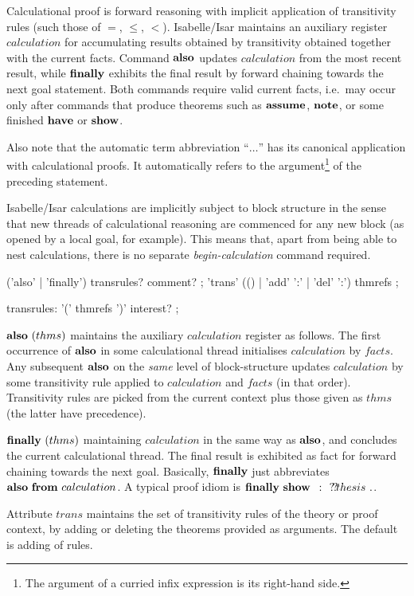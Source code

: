 Calculational proof is forward reasoning with implicit application of
transitivity rules (such those of $=$, $\le$, $<$).  Isabelle/Isar maintains
an auxiliary register $calculation$ for accumulating
results obtained by transitivity obtained together with the current facts.
Command ${\mathord{\mathbf{also}}}$ updates $calculation$ from the most recent result, while
${\mathord{\mathbf{finally}}}$ exhibits the final result by forward chaining towards the next goal
statement.  Both commands require valid current facts, i.e.\ may occur only
after commands that produce theorems such as ${\mathord{\mathbf{assume}}}$, ${\mathord{\mathbf{note}}}$, or
some finished ${\mathord{\mathbf{have}}}$ or ${\mathord{\mathbf{show}}}$.

Also note that the automatic term abbreviation ``$\dots$'' has its canonical
application with calculational proofs.  It automatically refers to the
argument\footnote{The argument of a curried infix expression is its right-hand
  side.} of the preceding statement.

Isabelle/Isar calculations are implicitly subject to block structure in the
sense that new threads of calculational reasoning are commenced for any new
block (as opened by a local goal, for example).  This means that, apart from
being able to nest calculations, there is no separate \emph{begin-calculation}
command required.

\begin{rail}
  ('also' | 'finally') transrules? comment?
  ;
  'trans' (() | 'add' ':' | 'del' ':') thmrefs
  ;

  transrules: '(' thmrefs ')' interest?
  ;
\end{rail}

\begin{descr}
\item [${\mathord{\mathbf{also}}}~(thms)$] maintains the auxiliary $calculation$ register as
  follows.  The first occurrence of ${\mathord{\mathbf{also}}}$ in some calculational thread
  initialises $calculation$ by $facts$. Any subsequent ${\mathord{\mathbf{also}}}$ on the
  \emph{same} level of block-structure updates $calculation$ by some
  transitivity rule applied to $calculation$ and $facts$ (in that order).
  Transitivity rules are picked from the current context plus those given as
  $thms$ (the latter have precedence).
  
\item [${\mathord{\mathbf{finally}}}~(thms)$] maintaining $calculation$ in the same way as
  ${\mathord{\mathbf{also}}}$, and concludes the current calculational thread.  The final result
  is exhibited as fact for forward chaining towards the next goal. Basically,
  ${\mathord{\mathbf{finally}}}$ just abbreviates ${\mathord{\mathbf{also}}}~{\mathord{\mathbf{from}}}~calculation$.  A typical proof
  idiom is $\FINALLY~\SHOW~\VVar{thesis}~\DOT$.
  
\item [Attribute $trans$] maintains the set of transitivity rules of the
  theory or proof context, by adding or deleting the theorems provided as
  arguments.  The default is adding of rules.
\end{descr}

